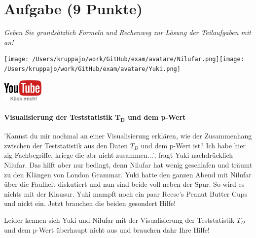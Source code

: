 \documentclass[a4paper, 9pt]{scrartcl}\usepackage[]{graphicx}\usepackage[]{xcolor}
\begin{document}
 
\clearpage

\section{Aufgabe \hfill (9 Punkte)}

\textit{Geben Sie grundsätzlich Formeln und Rechenweg zur Lösung der Teilaufgaben mit an!} \\[1Ex]


 
\begin{minipage}[t]{0.5\textwidth}
\texttt{[image: /Users/kruppajo/work/GitHub/exam/avatare/Nilufar.png]}\hspace{-4mm}\texttt{[image: /Users/kruppajo/work/GitHub/exam/avatare/Yuki.png]}
\end{minipage}
\begin{minipage}[t]{0.5\textwidth}
\hfill
\href{https://youtu.be/32JjH1eyuTU}{\includegraphics[width = 2cm]{img/youtube}}
\end{minipage}



\paragraph{Visualisierung der Teststatistik $\boldsymbol{T_D}$ und dem p-Wert}

'Kannst du mir nochmal an einer Visualisierung erklären, wie der Zusammenhang zwischen der Teststatistik aus den Daten $T_D$ und dem p-Wert ist? Ich habe hier zig Fachbegriffe, kriege die abr nicht zusammen...', fragt Yuki nachdrücklich  Nilufar. Das hilft aber nur bedingt, denn Nilufar hat wenig geschlafen und träumt zu den Klängen von London Grammar. Yuki hatte den ganzen Abend mit Nilufar über die Faulheit diskutiert und nun sind beide voll neben der Spur. So wird es nichts mit der Klausur. Yuki mampft noch ein paar Reese's Peanut Butter Cups und nickt ein. Jetzt brauchen die beiden gesondert Hilfe!

\vspace{1ex}

Leider kennen sich Yuki und Nilufar mit der Visualisierung der Teststatistik $T_D$ und dem p-Wert überhaupt nicht aus und brauchen dahr Ihre Hilfe!
\end{document}
